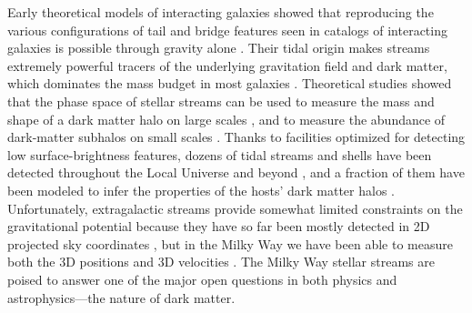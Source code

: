 \documentclass[final,5p,times,twocolumn,authoryear]{elsarticle}
\begin{document}
Early theoretical models of interacting galaxies showed that reproducing the various configurations of tail and bridge features seen in catalogs of interacting galaxies \citep{vorontsov-velyaminov:1959, arp:1966} is possible through gravity alone \citep{pfleiderer:1963, toomre:1972}.
Their tidal origin makes streams extremely powerful tracers of the underlying gravitation field and dark matter, which dominates the mass budget in most galaxies \citep[e.g.,][]{moster:2010, behroozi:2019}.
Theoretical studies showed that the phase space of stellar streams can be used to measure the mass and shape of a dark matter halo on large scales \citep{springel:1999, dubinski:1999,johnston:1999}, and to measure the abundance of dark-matter subhalos on small scales \citep{johnston:2002, ibata:2002, siegal-gaskins:2008}.
Thanks to facilities optimized for detecting low surface-brightness features, dozens of tidal streams and shells have been detected throughout the Local Universe \citep[e.g.,][]{martinez-delgado:2010, martinez-delgado:2023, bilek:2020} and beyond \citep[e.g.,][]{kado-fong:2018, ren:2020}, and a fraction of them have been modeled to infer the properties of the hosts' dark matter halos \citep{amorisco:2015, vandokkum:2019, pearson:2022}.
Unfortunately, extragalactic streams provide somewhat limited constraints on the gravitational potential because they have so far been mostly detected in 2D projected sky coordinates \citep[e.g.,][]{pearson:2022,nibauer:2023,walder:2024}, but in the Milky Way we have been able to measure both the 3D positions and 3D velocities \citep[e.g.,][]{koposov:2010}.
The Milky Way stellar streams are poised to answer one of the major open questions in both physics and astrophysics---the nature of dark matter.
\end{document}

